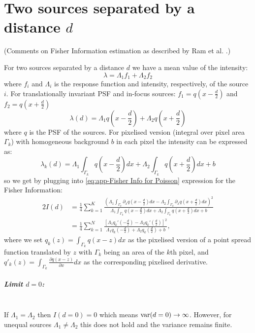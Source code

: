 \clearpage{}
\section{Two sources separated by a distance $d$\label{sub:Two-sources-separated}}
(Comments on Fisher Information estimation as described by Ram et al. \cite{Ram2006}.)


For two sources separated by a distance $d$ we have a mean value of the intensity:
%
\begin{equation}
	\lambda=\Lambda_1f_1+\Lambda_2f_2
\end{equation}
%
where $f_i$ and $\Lambda_i$ is the response function and intensity, respectively, of the source $i$. For translationally invariant PSF and in-focus sources: $f_1=q(x-\frac{d}{2})$ and $f_2=q(x+\frac{d}{2})$
%
\begin{equation}
	\lambda(d)=\Lambda_1q(x-\frac{d}{2})+\Lambda_2q(x+\frac{d}{2})
	\label{eq:app-expected intensity d/2}
\end{equation}
%
where $q$ is the PSF of the sources. For pixelised version (integral over pixel area $\Gamma_k$) with homogeneous background $b$ in each pixel the intensity can be expressed as:
%
\begin{equation}
	\lambda_k(d)=\Lambda_1\int_{\Gamma_k}q(x-\frac{d}{2})dx+\Lambda_2\int_{\Gamma_k}q(x+\frac{d}{2})dx+b
\end{equation}
%
so we get by plugging into \autoref{eq:app-Fisher Info for Poisson} expression for the Fisher Information:
%
\begin{alignat}{2}
	I(d)
	&=\frac{1}{4}\sum_{k=1}^K\frac{\left(\Lambda_1\int_{\Gamma_k}\partial_{x}q(x-\frac{d}{2})dx-\Lambda_2\int_{\Gamma_k}\partial_{x}q(x+\frac{d}{2})dx\right)^2}{\Lambda_1\int_{\Gamma_k}q(x-\frac{d}{2})dx+\Lambda_2\int_{\Gamma_k}q(x+\frac{d}{2})dx+b}\\
	&=\frac{1}{4}\sum_{k=1}^N\frac{\left[\Lambda_1q_k'(-\frac{d}{2})-\Lambda_2q_k'(\frac{d}{2})\right]^2}{\Lambda_1q_k(-\frac{d}{2})+\Lambda_2q_k(\frac{d}{2})+b},
	\label{eq:app-Fisher Info Pixelised - Ram}	
\end{alignat}
%
where we set $q_k(z)=\int_{\Gamma_k}q(x-z)dx$ as the pixelised version of a point spread function translated by $z$ with $\Gamma_k$ being an area of the $k$th pixel, and $q'_k(z)=\int_{\Gamma_k}\frac{\partial q(x-z)}{\partial x}dx$ as the corresponding pixelised derivative.


\subparagraph*{Limit $d=0$:}\ \\
If $\Lambda_1=\Lambda_2$ then $I(d=0)=0$ which means $\mathrm{var}(d=0)\rightarrow\infty$. However, for unequal sources $\Lambda_1\neq\Lambda_2$ this does not hold and the variance remains finite.

